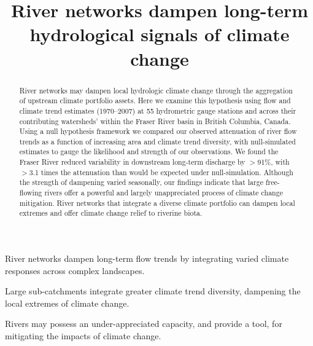 \documentclass[draft,linenumbers]{AGUJournal}
\begin{document}

\title{River networks dampen long-term hydrological signals of climate change}







\begin{keypoints}
\item River networks dampen long-term flow trends by integrating varied climate responses across complex landscapes.
\item Large sub-catchments integrate greater climate trend diversity, dampening the local extremes of climate change.
\item Rivers may possess an under-appreciated capacity, and provide a tool, for mitigating the impacts of climate change.
\end{keypoints}


\begin{abstract}
	River networks may dampen local hydrologic climate change through the aggregation of upstream climate portfolio assets. Here we examine this hypothesis using flow and climate trend estimates (1970--2007) at 55 hydrometric gauge stations and across their contributing watersheds' within the Fraser River basin in British Columbia, Canada. Using a null hypothesis framework we compared our observed attenuation of river flow trends as a function of increasing area and climate trend diversity, with null-simulated estimates to gauge the likelihood and strength of our observations. We found the Fraser River reduced variability in downstream long-term discharge by $>$91\%, with $>$3.1 times the attenuation than would be expected under null-simulation. Although the strength of dampening varied seasonally, our findings indicate that large free-flowing rivers offer a powerful and largely unappreciated process of climate change mitigation. River networks that integrate a diverse climate portfolio can dampen local extremes and offer climate change relief to riverine biota.
\end{abstract}
\end{document}
